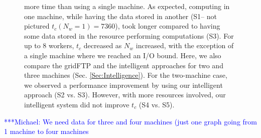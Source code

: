 \documentclass{rspublic}
\newcommand{\micnote}[1]{ {\textcolor{blue} { ***Michael: #1 }}}
\newcommand{\betynote}[1]{ {\textcolor{orange} { ***Bety: #1 }}}
\newcommand{\jhanote}[1]{} \newcommand{\micnote}[1]{}\newcommand{\betynote}[1]{} \newcommand{\fixme}[1]{}
\begin{document}
\begin{figure}[!ht]
\begin{center}
{more time than using a single machine. As expected, computing in one
machine, while having the data stored in another (S1-- not pictured $t_c(N_w=1)=7360$), took longer
compared to having some data stored in the resource performing
computations (S3). For up to 8 workers, $t_c$ decreased as $N_w$
increased, with the exception of a single machine where we reached an
I/O bound. Here, we also compare the gridFTP and the intelligent approaches for two and three machines (Sec. \ref{Sec:Intelligence}). For
the two-machine case, we observed a performance improvement by using our
intelligent approach (S2 vs. S3). However, with more resources involved, our
intelligent system did not improve $t_c$ (S4 vs. S5).}
\label{Fig:ExpIConventionalLocal}
\end{center}
\end{figure}




\micnote{We need data for three and four
machines (just one graph going from 1 machine to four machines}

\end{document}
